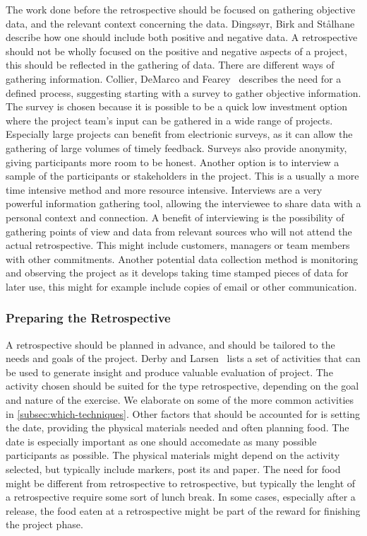 \documentclass[12pt]{article}
\begin{document}
The work done before the retrospective should be focused on gathering objective data, and the relevant context concerning the data. Dingsøyr, Birk and Stålhane~\cite{Moe2001}  describe how one should include both positive and negative data. A retrospective should not be wholly focused on the positive and negative aspects of a project, this should be reflected in the gathering of data. There are different ways of gathering information. Collier, DeMarco and Fearey~\cite{Collier1996} describes the need for a defined process, suggesting starting with a survey to gather objective information. The survey is chosen because it is possible to be a quick low investment option where the project team's input can be gathered in a wide range of projects. Especially large projects can benefit from electrionic surveys, as it can allow the gathering of large volumes of timely feedback. Surveys also provide anonymity, giving participants more room to be honest. Another option is to interview a sample of the participants or stakeholders in the project. This is a usually a more time intensive method and more resource intensive. Interviews are a very powerful information gathering tool, allowing the interviewee to share data with a personal context and connection. A benefit of interviewing is the possibility of gathering points of view and data from relevant sources who will not attend the actual retrospective. This might include customers, managers or team members with other commitments. Another potential data collection method is monitoring and observing the project as it develops taking time stamped pieces of data for later use, this might for example include copies of email or other communication. 

\subsubsection{Preparing the Retrospective}

A retrospective should be planned in advance, and should be tailored to the needs and goals of the project. Derby and Larsen~\cite{Derby2007} lists a set of activities that can be used to generate insight and produce valuable evaluation of project. The activity chosen should be suited for the type retrospective, depending on the goal and nature of the exercise. We elaborate on some of the more common activities in \autoref{subsec:which-techniques}. Other factors that should be accounted for is setting the date, providing the physical materials needed and often planning food. The date is especially important as one should accomedate as many possible participants as possible. The physical materials might depend on the activity selected, but typically include markers, post its and paper. The need for food might be different from retrospective to retrospective, but typically the lenght of a retrospective require some sort of lunch break. In some cases, especially after a release, the food eaten at a retrospective might be part of the reward for finishing the project phase.
\end{document}
